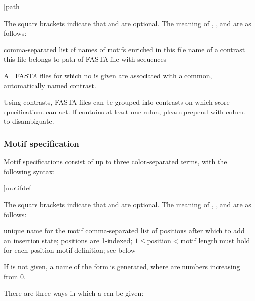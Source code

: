 \documentclass[a4paper]{article}
\begin{document}
\begin{verbbox}
[names:[contrast:]]path
\end{verbbox}
\fbox{\theverbbox[t]}

The square brackets indicate that  and  are optional.
The meaning of , , and  are as follows:

\begin{description}
  comma-separated list of names of motifs enriched in this file
  name of a contrast this file belongs to
  path of FASTA file with sequences
\end{description}

All FASTA files for which no  is given are associated with a common, automatically named contrast.

Using contrasts, FASTA files can be grouped into contrasts on which score specifications can act.
If  contains at least one colon, please prepend with colons to disambiguate.

\subsubsection{Motif specification}
\label{section:motif-specification}
Motif specifications consist of up to three colon-separated terms, with the following syntax:

\begin{verbbox}
[name:[insert:]]motifdef
\end{verbbox}
\fbox{\theverbbox[t]}

The square brackets indicate that  and  are optional.
The meaning of , , and  are as follows:

\begin{description}
    unique name for the motif
    comma-separated list of positions after which to add an insertion state; positions are 1-indexed; $1 \leq \text{position} < \text{motif length}$ must hold for each position
    motif definition; see below
\end{description}

If  is not given, a name of the form  is generated, where  are numbers increasing from 0.

There are three ways in which a  can be given:
\end{document}
